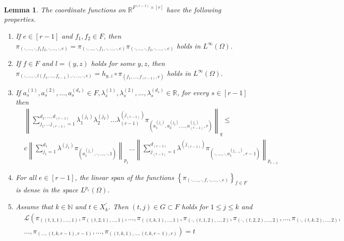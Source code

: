 \documentclass[11pt]{article}
\newtheorem{lemma}[theorem]{Lemma}
\begin{document}
\begin{lemma}\label{LemmaPropertiesCoordinateFunct}
 The coordinate functions on $\mathbb{R}^{F^{(r-1)} \times[r]}$ have the following properties.
 \begin{enumerate}
\item  If $e\in [r-1]$ and $f_{1}, f_{2} \in F$, then $\pi_{\left(\cdot,\ldots,\cdot ,f_{1} f_{2},\cdot,\ldots,\cdot,  e\right)}=\pi_{\left(\cdot,\ldots,\cdot ,f_{1},\cdot,\ldots,\cdot , e\right)} \pi_{(\cdot,\ldots,\cdot ,f_{2},\cdot,\ldots,\cdot ,e)}$ holds in $L^{\infty}(\Omega)$.
\item  If $f \in F$ and $l=(y, z)$ holds for some $y, z$, then $\pi_{(\cdot,\ldots,\cdot ,l(f_1,\ldots,f_{r-1}),\cdot,\ldots,\cdot, e)}=h_{y, z} \circ \pi_{(f_1,\ldots,f_{(r-1)}, r)}$ holds in $L^{\infty}(\Omega)$.
\item  If $a^{(1)}_{s}, a^{(2)}_{s}, \ldots, a_{s}^{(d_s)} \in F, \lambda_s^{(1)}, \lambda_s^{(2)}, \ldots, \lambda_s^{(d_s)} \in \mathbb{R}$, for every $s\in [r-1]$ then
$$\begin{aligned}
&\left\|\sum_{j_1,\ldots j_{(r-1)}=1}^{d_1,\ldots,d_{(r-1)}} \lambda_1^{(j_1)} \lambda_2^{(j_2)}\ldots \lambda_{(r-1)}^{(j_{(r-1)})} \pi_{\left(a^{(j_1)}_{1}, a^{(j_2)}_{2}, \ldots, a_{(r-1)}^{(j_s)}, r\right)}\right\|_{q} \leq \\
& c\left\|\sum_{j_1=1}^{d_1} \lambda^{(j_1)} \pi_{\left(a^{(j_1)}_{1},\cdot, \ldots, \cdot, 1\right)}\right\|_{p_1}\ldots\left\|\sum_{j_{(r-1)}=1}^{d_{(r-1)}} \lambda^{(j_{(r-1)})} \pi_{\left(\cdot, \ldots, \cdot,a^{(j_{r-1})}_{1}, r-1\right)}\right\|_{p_{r-1}}
\end{aligned}
$$
\item  For all $e\in [r-1]$, the linear span of the functions $\left\{\pi_{(\cdot,\ldots , \cdot,f,\cdot, \ldots,\cdot, e)}\right\}_{f \in F}$ is dense in the space $L^{p_e}(\Omega)$.
\item  Assume that $k \in \mathbb{N}$ and $t \in X_{k}^{\prime}$. Then $(t, j) \in G \subset F$ holds for $1 \leq j \leq k$ and
\begin{equation*}\begin{aligned}
& \mathcal{L}\left(\pi_{((t, 1,1),\ldots, 1)}, \pi_{((t, 2,1),\ldots, 1)}, \ldots, \pi_{((t, k,1),\ldots,1)}, \pi_{(\cdot,(t, 1,2),\ldots, 2)}, \pi_{(\cdot, (t, 2,2),\ldots, 2)}, \ldots, \pi_{(\cdot,(t, k,2),\ldots, 2)},\right. \\ & \left.
 \ldots, \pi_{(\ldots,(t, k,r-1), r-1)},\ldots,\pi_{((t, k,1),\ldots,(t, k,r-1), r)}\right)=t
 \end{aligned}
\end{equation*}

 \end{enumerate}
\end{lemma}
\end{document}
